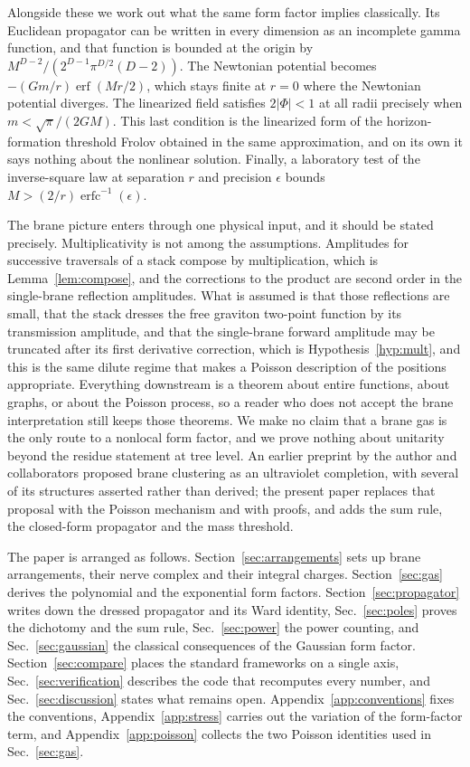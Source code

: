 \documentclass[aps,prd,10pt,twocolumn,superscriptaddress,nofootinbib,floatfix,longbibliography,showpacs,showkeys]{revtex4-2}
\theoremstyle{plain}
\theoremstyle{definition}
\theoremstyle{remark}
\newcommand{\erf}{\operatorname{erf}}
\newcommand{\erfc}{\operatorname{erfc}}
\begin{document}
Alongside these we work out what the same form factor implies classically. Its Euclidean propagator can be written in every dimension as an incomplete gamma function, and that function is bounded at the origin by $M^{D-2}/(2^{D-1}\pi^{D/2}(D-2))$. The Newtonian potential becomes $-(Gm/r)\erf(Mr/2)$, which stays finite at $r=0$ where the Newtonian potential diverges. The linearized field satisfies $2|\Phi|<1$ at all radii precisely when $m<\sqrt\pi/(2GM)$. This last condition is the linearized form of the horizon-formation threshold Frolov \cite{Frolov2015} obtained in the same approximation, and on its own it says nothing about the nonlinear solution. Finally, a laboratory test of the inverse-square law at separation $r$ and precision $\epsilon$ bounds $M>(2/r)\erfc^{-1}(\epsilon)$.

The brane picture enters through one physical input, and it should be stated precisely. Multiplicativity is not among the assumptions. Amplitudes for successive traversals of a stack compose by multiplication, which is Lemma~\ref{lem:compose}, and the corrections to the product are second order in the single-brane reflection amplitudes. What is assumed is that those reflections are small, that the stack dresses the free graviton two-point function by its transmission amplitude, and that the single-brane forward amplitude may be truncated after its first derivative correction, which is Hypothesis~\ref{hyp:mult}, and this is the same dilute regime that makes a Poisson description of the positions appropriate. Everything downstream is a theorem about entire functions, about graphs, or about the Poisson process, so a reader who does not accept the brane interpretation still keeps those theorems. We make no claim that a brane gas is the only route to a nonlocal form factor, and we prove nothing about unitarity beyond the residue statement at tree level. An earlier preprint by the author and collaborators \cite{Bhattacharjee2025brane} proposed brane clustering as an ultraviolet completion, with several of its structures asserted rather than derived; the present paper replaces that proposal with the Poisson mechanism and with proofs, and adds the sum rule, the closed-form propagator and the mass threshold.

The paper is arranged as follows. Section~\ref{sec:arrangements} sets up brane arrangements, their nerve complex and their integral charges. Section~\ref{sec:gas} derives the polynomial and the exponential form factors. Section~\ref{sec:propagator} writes down the dressed propagator and its Ward identity, Sec.~\ref{sec:poles} proves the dichotomy and the sum rule, Sec.~\ref{sec:power} the power counting, and Sec.~\ref{sec:gaussian} the classical consequences of the Gaussian form factor. Section~\ref{sec:compare} places the standard frameworks on a single axis, Sec.~\ref{sec:verification} describes the code that recomputes every number, and Sec.~\ref{sec:discussion} states what remains open. Appendix~\ref{app:conventions} fixes the conventions, Appendix~\ref{app:stress} carries out the variation of the form-factor term, and Appendix~\ref{app:poisson} collects the two Poisson identities used in Sec.~\ref{sec:gas}.
\end{document}
